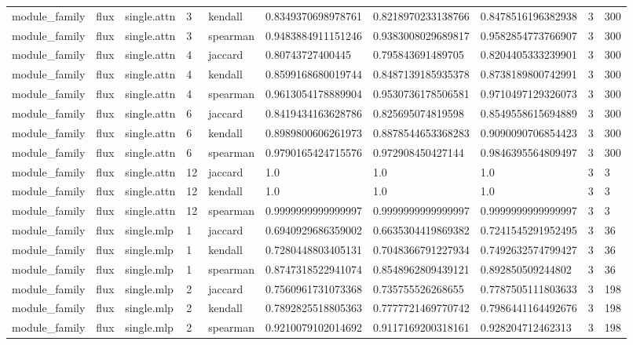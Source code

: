 \begin{tabular}{llllllllll}
module\_family & flux & single.attn & 3 & kendall & 0.8349370698978761 & 0.8218970233138766 & 0.8478516196382938 & 3 & 300 \\
module\_family & flux & single.attn & 3 & spearman & 0.9483884911151246 & 0.9383008029689817 & 0.9582854773766907 & 3 & 300 \\
module\_family & flux & single.attn & 4 & jaccard & 0.80743727400445 & 0.795843691489705 & 0.8204405333239901 & 3 & 300 \\
module\_family & flux & single.attn & 4 & kendall & 0.8599168680019744 & 0.8487139185935378 & 0.8738189800742991 & 3 & 300 \\
module\_family & flux & single.attn & 4 & spearman & 0.9613054178889904 & 0.9530736178506581 & 0.9710497129326073 & 3 & 300 \\
module\_family & flux & single.attn & 6 & jaccard & 0.8419434163628786 & 0.825695074819598 & 0.8549558615694889 & 3 & 300 \\
module\_family & flux & single.attn & 6 & kendall & 0.8989800606261973 & 0.8878544653368283 & 0.9090090706854423 & 3 & 300 \\
module\_family & flux & single.attn & 6 & spearman & 0.9790165424715576 & 0.972908450427144 & 0.9846395564809497 & 3 & 300 \\
module\_family & flux & single.attn & 12 & jaccard & 1.0 & 1.0 & 1.0 & 3 & 3 \\
module\_family & flux & single.attn & 12 & kendall & 1.0 & 1.0 & 1.0 & 3 & 3 \\
module\_family & flux & single.attn & 12 & spearman & 0.9999999999999997 & 0.9999999999999997 & 0.9999999999999997 & 3 & 3 \\
module\_family & flux & single.mlp & 1 & jaccard & 0.6940929686359002 & 0.6635304419869382 & 0.7241545291952495 & 3 & 36 \\
module\_family & flux & single.mlp & 1 & kendall & 0.7280448803405131 & 0.7048366791227934 & 0.7492632574799427 & 3 & 36 \\
module\_family & flux & single.mlp & 1 & spearman & 0.8747318522941074 & 0.8548962809439121 & 0.892850509244802 & 3 & 36 \\
module\_family & flux & single.mlp & 2 & jaccard & 0.7560961731073368 & 0.735755526268655 & 0.7787505111803633 & 3 & 198 \\
module\_family & flux & single.mlp & 2 & kendall & 0.7892825518805363 & 0.7777721469770742 & 0.7986441164492676 & 3 & 198 \\
module\_family & flux & single.mlp & 2 & spearman & 0.9210079102014692 & 0.9117169200318161 & 0.928204712462313 & 3 & 198 \\

\end{tabular}
